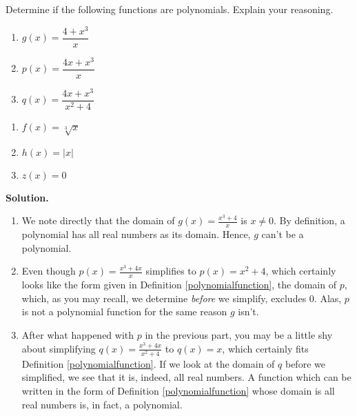 \begin{ex}  \label{intropolyexample} Determine if the following functions are polynomials.  Explain your reasoning.

\begin{multicols}{3}
\begin{enumerate}

\item  $g(x) = \dfrac{4+x^3}{x}$
\item  $p(x) = \dfrac{4x+x^3}{x}$
\item  $q(x) = \dfrac{4x+x^3}{x^2+4}$

\setcounter{HW}{\value{enumi}}
\end{enumerate}
\end{multicols}

\begin{multicols}{3}
\begin{enumerate}
\setcounter{enumi}{\value{HW}}

\item  $f(x) =\sqrt[3]{x}$
\item  $h(x) = |x|$
\item  $z(x) = 0$

\end{enumerate}
\end{multicols}

\pagebreak

{\bf Solution.}

\begin{enumerate}

\item  We note directly that the domain of $g(x) = \frac{x^3+4}{x}$ is $x \neq 0$.  By definition, a polynomial has all real numbers as its domain.  Hence, $g$ can't be a polynomial.

\item  Even though $p(x) = \frac{x^3+4x}{x}$ simplifies to $p(x) = x^2+4$, which certainly looks like the form given in Definition \ref{polynomialfunction}, the domain of $p$, which, as you may recall, we determine \emph{before} we simplify, excludes $0$.  Alas, $p$ is not a polynomial function for the same reason $g$ isn't.

\item  After what happened with $p$ in the previous part, you may be a little shy about simplifying $q(x) = \frac{x^3+4x}{x^2+4}$ to $q(x) = x$, which certainly fits Definition \ref{polynomialfunction}.  If we look at the domain of $q$ before we simplified, we see that it is, indeed, all real numbers.  A function which can be written in the form of Definition \ref{polynomialfunction} whose domain is all real numbers is, in fact, a polynomial.  


\end{enumerate}
\end{ex}
